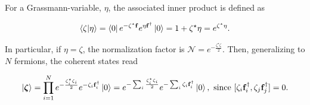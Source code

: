 For a Grassmann-variable, $\eta$, the associated inner product is defined as 

\begin{equation}\begin{split}
    \bra{\zeta} \ket{\eta} = \bra{0} e^{-\zeta^\star {\bf f}} e^{{\eta} {\bf f}^\dagger}\ket{0} = 1 + \zeta^\star\eta = e^{\zeta^\star\eta}.
\end{split}
\end{equation}
    
In particular, if $\eta = \zeta$, the normalization factor is $\mathcal{N} = e^{-\frac{\zeta^\star\zeta}{2}}$. Then, generalizing to $N$ fermions, the coherent states read

$$
    \ket{{\bm \zeta}} = \prod_{i=1}^{N} e^{-\frac{\zeta^\star_i\zeta_i}{2}} e^{-\zeta_i {\bf f}_i^\dagger} \ket{0} = e^{-\sum_{i} \frac{\zeta^\star_i\zeta_i}{2}} e^{-\sum_{i} \zeta_i {\bf f}_i^\dagger} \ket{0}, \textnormal{ since } [\zeta_i {\bf f}_i^\dagger, \zeta_j {\bf f}_j^\dagger] = 0.
$$

